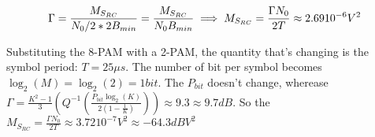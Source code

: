 \begin{exercize}[1]
\begin{equation}
  \Gamma = \frac{M_{S_{RC}}}{N_0/2 * 2B_{min}} = \frac{M_{S_{RC}}}{N_0  B_{min}}\\
  \implies M_{S_{RC}} = \frac{\Gamma N_0}{2T} \approx 2.69 10^{-6}V^2
\end{equation}

  \proofpart
  Substituting the 8-PAM  with a 2-PAM, the quantity that's changing is the symbol period: $T=25 \mu s$.
  The number of bit per symbol becomes $\log_2(M) = \log_2(2) = 1bit$.
  The $P_{bit}$ doesn't change, wherease $\Gamma = \frac{K^2 -1}{3}\left(Q^{-1}\left(\frac{P_{bit} \log_2(K)}{2 \left(1-\frac{1}{K}\right)}\right)\right)\approx 9.3 \approx 9.7dB$. So the $M_{S_{RC}} = \frac{\Gamma N_0}{2T} \approx 3.72 10^{-7}V^2 \approx -64.3 dBV^2$
\end{exercize}

